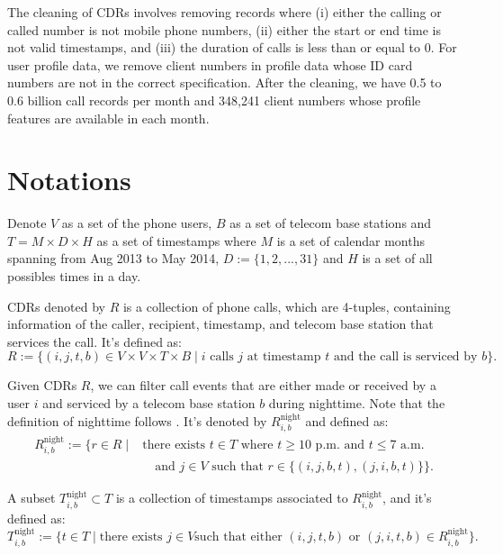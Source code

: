 The cleaning of CDRs involves removing records where (i) either the calling or called number is not mobile phone numbers, (ii) either the start or end time is not valid timestamps, and (iii) the duration of calls is less than or equal to 0. For user profile data, we remove client numbers in profile data whose ID card numbers are not in the correct specification. After the cleaning, we have 0.5 to 0.6 billion call records per month and 348,241 client numbers whose profile features are available in each month.


\section{Notations}\label{sec:notations}
Denote $V$ as a set of the phone users, $B$ as a set of telecom base stations and $T = M \times D \times H$ as a set of timestamps where $M$ is a set of calendar months spanning from Aug 2013 to May 2014, $D := \{1, 2, ..., 31\}$ and $H$ is a set of all possibles times in a day.

\begin{definition}
CDRs denoted by $R$ is a collection of phone calls, which are 4-tuples, containing information of the caller, recipient, timestamp, and telecom base station that services the call. It's defined as:
$$
R := \{
  (i, j, t, b) \in V \times V \times T \times B
  \mid
  i \text{ calls } j \text{ at timestamp } t \text{ and }
  \text{the call is serviced by } b
\}.
$$
\end{definition}

\begin{definition}
Given CDRs $R$, we can filter call events that are either made or received by a user $i$ and serviced by a telecom base station $b$ during nighttime. Note that the definition of nighttime follows \cite{referral_effect_2023aer}. It's denoted by $R^{\text{night}}_{i, b}$ and defined as:
\begin{align*}
R^{\text{night}}_{i, b} := \{
    r \in R
    \mid
    &\text{there exists } t \in T \text{ where } t \geq \text{10 p.m.} \text{ and } t \leq \text{7 a.m.} \\
    &\quad \text{and } j \in V \text{ such that } r \in \{(i, j, b, t), (j, i, b, t) \}
 \}.
\end{align*}
\end{definition}

\begin{definition}
A subset $T^{\text{night}}_{i, b} \subset T$ is a collection of timestamps associated to $R^{\text{night}}_{i, b}$, and it's defined as:
$$
T^{\text{night}}_{i, b} :=
\{
    t \in T
    \mid
    \text{there exists } j \in V
    \text{such that either } (i, j, t, b) \text{ or } (j, i, t, b) \in R^{\text{night}}_{i, b}
\}.
$$
\end{definition}

